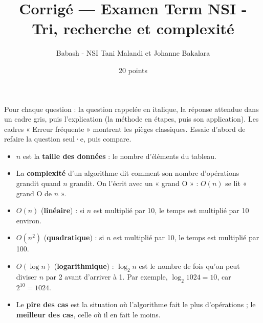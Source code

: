 \documentclass[11pt, a4paper]{exam}
\title{Corrigé --- Examen Term NSI - Tri, recherche et complexité}
\author{Babash - NSI Tani Malandi et Johanne Bakalara}
\date{20 points}
\begin{document}
\pagestyle{foot}
\maketitle
\thispagestyle{foot}

\begin{retenir}
Pour chaque question : la question rappelée en italique, la réponse attendue dans un cadre gris, puis l'explication (la méthode en étapes, puis son application). Les cadres « Erreur fréquente » montrent les pièges classiques. Essaie d'abord de refaire la question seul·e, puis compare.
\end{retenir}

\begin{retenir}
\begin{itemize}
\item $n$ est la \textbf{taille des données} : le nombre d'éléments du tableau.
\item La \textbf{complexité} d'un algorithme dit comment son nombre d'opérations grandit quand $n$ grandit. On l'écrit avec un « grand O » : $O(n)$ se lit « grand O de $n$ ».
\item $O(n)$ (\textbf{linéaire}) : si $n$ est multiplié par 10, le temps est multiplié par 10 environ.
\item $O(n^2)$ (\textbf{quadratique}) : si $n$ est multiplié par 10, le temps est multiplié par 100.
\item $O(\log n)$ (\textbf{logarithmique}) : $\log_2 n$ est le nombre de fois qu'on peut diviser $n$ par 2 avant d'arriver à 1. Par exemple, $\log_2 1024 = 10$, car $2^{10} = 1024$.
\item Le \textbf{pire des cas} est la situation où l'algorithme fait le plus d'opérations ; le \textbf{meilleur des cas}, celle où il en fait le moins.
\end{itemize}
\end{retenir}
\end{document}

